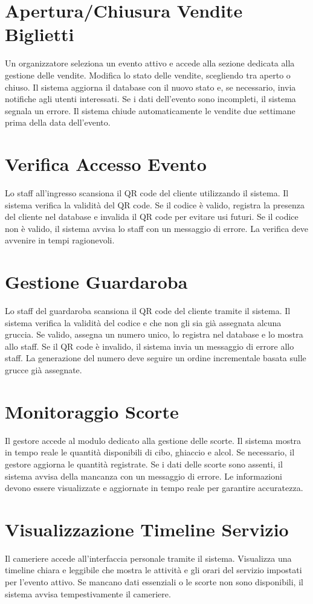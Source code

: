 \documentclass[a4paper,12pt]{article}
\begin{document}
\section{\textcolor{sectioncolor}{Apertura/Chiusura Vendite Biglietti}}
\textcolor{textcolor}{
Un organizzatore seleziona un evento attivo e accede alla sezione dedicata alla gestione delle vendite. Modifica lo stato delle vendite, scegliendo tra aperto o chiuso. Il sistema aggiorna il database con il nuovo stato e, se necessario, invia notifiche agli utenti interessati. Se i dati dell’evento sono incompleti, il sistema segnala un errore. Il sistema chiude automaticamente le vendite due settimane prima della data dell’evento.
}


\section{\textcolor{sectioncolor}{Verifica Accesso Evento}}
\textcolor{textcolor}{
Lo staff all'ingresso scansiona il QR code del cliente utilizzando il sistema. Il sistema verifica la validità del QR code. Se il codice è valido, registra la presenza del cliente nel database e invalida il QR code per evitare usi futuri. Se il codice non è valido, il sistema avvisa lo staff con un messaggio di errore. La verifica deve avvenire in tempi ragionevoli.
}

\section{\textcolor{sectioncolor}{Gestione Guardaroba}}
\textcolor{textcolor}{
Lo staff del guardaroba scansiona il QR code del cliente tramite il sistema. Il sistema verifica la validità del codice e che non gli sia già assegnata alcuna gruccia. Se valido, assegna un numero unico, lo registra nel database e lo mostra allo staff. Se il QR code è invalido, il sistema invia un messaggio di errore allo staff. La generazione del numero deve seguire un ordine incrementale basata sulle grucce già assegnate.
}

\section{\textcolor{sectioncolor}{Monitoraggio Scorte}}
\textcolor{textcolor}{
Il gestore accede al modulo dedicato alla gestione delle scorte. Il sistema mostra in tempo reale le quantità disponibili di cibo, ghiaccio e alcol. Se necessario, il gestore aggiorna le quantità registrate. Se i dati delle scorte sono assenti, il sistema avvisa della mancanza con un messaggio di errore. Le informazioni devono essere visualizzate e aggiornate in tempo reale per garantire accuratezza.
}

\section{\textcolor{sectioncolor}{Visualizzazione Timeline Servizio}}
\textcolor{textcolor}{
Il cameriere accede all’interfaccia personale tramite il sistema. Visualizza una timeline chiara e leggibile che mostra le attività e gli orari del servizio impostati per l’evento attivo. Se mancano dati essenziali o le scorte non sono disponibili, il sistema avvisa tempestivamente il cameriere.
}
\end{document}
